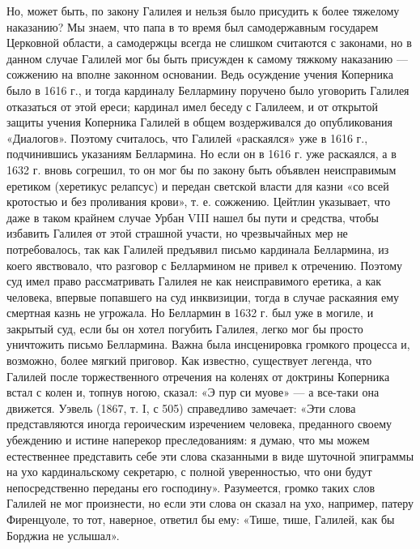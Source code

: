 Но, может  быть, по  закону Галилея  и нельзя  было присудить  к более
тяжелому наказанию?  Мы знаем, что  папа в то время  был самодержавным
государем Церковной области, а  самодержцы всегда не слишком считаются
с  законами, но  в  данном  случае Галилей  мог  бы  быть присужден  к
самому тяжкому  наказанию ---  сожжению на вполне  законном основании.
Ведь  осуждение учения  Коперника было  в 1616  г., и  тогда кардиналу
Беллармину поручено  было уговорить Галилея отказаться  от этой ереси;
кардинал имел беседу с Галилеем, и от открытой защиты учения Коперника
Галилей  в общем  воздерживался до  опубликования «Диалогов».  Поэтому
считалось,  что  Галилей  «раскаялся»  уже  в  1616  г.,  подчинившись
указаниям Беллармина. Но если он в 1616  г. уже раскаялся, а в 1632 г.
вновь  согрешил, то  он мог  бы по  закону быть  объявлен неисправимым
еретиком (херетикус релапсус) и передан  светской власти для казни «со
всей  кротостью  и без  проливания  крови»,  т. е.  сожжению.  Цейтлин
указывает, что  даже в таком крайнем  случае Урбан VIII нашел  бы пути
и  средства,  чтобы  избавить  Галилея от  этой  страшной  участи,  но
чрезвычайных мер  не потребовалось,  так как Галилей  предъявил письмо
кардинала Беллармина, из коего  явствовало, что разговор с Беллармином
не привел к отречению. Поэтому суд имел право рассматривать Галилея не
как неисправимого  еретика, а как  человека, впервые попавшего  на суд
инквизиции, тогда в  случае раскаяния ему смертная  казнь не угрожала.
Но Беллармин  в 1632  г. был  уже в  могиле, и  закрытый суд,  если бы
он  хотел погубить  Галилея,  легко мог  бы  просто уничтожить  письмо
Беллармина.  Важна была  инсценировка громкого  процесса и,  возможно,
более мягкий  приговор. Как известно, существует  легенда, что Галилей
после торжественного отречения на  коленях от доктрины Коперника встал
с  колен и,  топнув ногою,  сказал: «Э  пур си  муове» ---  а все-таки
она  движется.  Уэвель  (1867,  т. I,  с  505)  справедливо  замечает:
«Эти  слова  представляются  иногда героическим  изречением  человека,
преданного  своему  убеждению  и истине  наперекор  преследованиям:  я
думаю, что мы можем естественнее представить себе эти слова сказанными
в виде  шуточной эпиграммы на  ухо кардинальскому секретарю,  с полной
уверенностью, что  они будут непосредственно переданы  его господину».
Разумеется, громко таких  слов Галилей не мог произнести,  но если эти
слова он сказал на ухо, например, патеру Фиренцуоле, то тот, наверное,
ответил бы ему: «Тише, тише, Галилей, как бы Борджиа не услышал».

